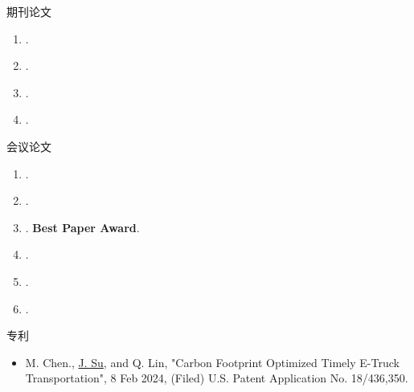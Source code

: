 \documentclass{resume} %
\begin{document}
\begin{rSection}{期刊论文}
    \begin{enumerate}
        \item {}.
        \item {}.
        \item {}.
        \item {}.
    \end{enumerate}
\end{rSection}

\begin{rSection}{会议论文}
    
    \begin{enumerate}
         \item {}.
         \item {}.
         \item {}. \textbf{Best Paper Award}.
        \item {}.
        \item {}.
        \item {}.
    \end{enumerate}
\end{rSection}

\begin{rSection}{专利}
    \begin{itemize}
        \item M. Chen., \underline{J. Su}, and Q. Lin, "Carbon Footprint Optimized Timely E-Truck Transportation", 8 Feb 2024, (Filed) U.S. Patent Application No. 18/436,350.
    \end{itemize}
\end{rSection}
\end{document}
